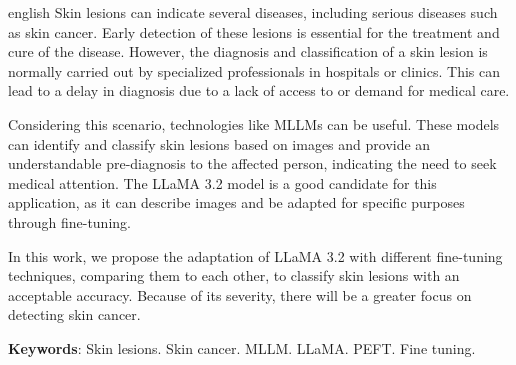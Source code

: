 \begin{resumo}[Abstract]
	\SingleSpacing
	\begin{otherlanguage*}{english}
		Skin lesions can indicate several diseases, including serious diseases such as skin cancer. Early detection of these lesions is essential for the treatment
		and cure of the disease. However, the diagnosis and classification of a skin lesion is normally carried out by specialized professionals in hospitals or clinics.
		This can lead to a delay in diagnosis due to a lack of access to or demand for medical care.

		Considering this scenario, technologies like \acp{MLLM} can be useful. These models can identify and classify skin lesions based on images and provide an
		understandable pre-diagnosis to the affected person, indicating the need to seek medical attention. The \ac{LLaMA 3.2} model  is a good candidate for this
		application, as it can describe images and be adapted for specific purposes through fine-tuning.

		In this work, we propose the adaptation of \ac{LLaMA 3.2} with different fine-tuning techniques, comparing them to each other, to classify skin lesions with an
		acceptable accuracy. Because of its severity, there will be a greater focus on detecting skin cancer.

		\textbf{Keywords}: Skin lesions. Skin cancer. MLLM. LLaMA. PEFT. Fine tuning.
	\end{otherlanguage*}
\end{resumo}

{
\hypersetup{hidelinks}

\listoffigures

\imprimirlistadesiglas

\tableofcontents*
\cleardoublepage
}
